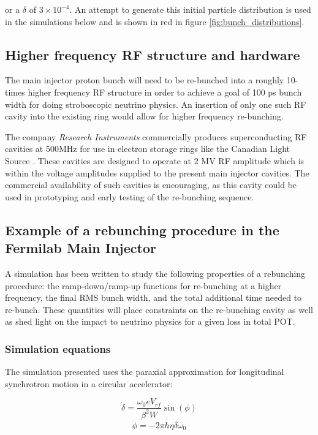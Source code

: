 or a $\delta$ of $3\times 10^{-4}$. An attempt to generate this initial particle distribution
is used in the simulations below and is shown in red in figure \ref{fig:bunch_distributions}.


\subsection{Higher frequency RF structure and hardware}

The main injector proton bunch will need to be re-bunched into a
roughly 10-times higher frequency RF structure in order to achieve a
goal of 100 ps bunch width for doing stroboscopic neutrino physics. An
insertion of only one such RF cavity into the existing ring would
allow for higher frequency re-bunching.

The company \textit{Research Instruments} commercially produces
superconducting RF cavities at 500MHz for use in electron storage
rings like the Canadian Light Source
\cite{nsls-cavity}\cite{cls_stampe}\cite{research_instruments}. These
cavities are designed to operate at 2 MV RF amplitude which is within the
voltage amplitudes supplied to the present main injector cavities.
 The commercial availability of such cavities is encouraging,
as this cavity could be used in prototyping and early testing of the
re-bunching sequence. 


\subsection{Example of a rebunching procedure in the Fermilab Main Injector}

A simulation has been written to study the following properties of a
rebunching procedure: the ramp-down/ramp-up functions for re-bunching
at a higher frequency, the final RMS bunch width, and the total
additional time needed to re-bunch. These quantities will place
constraints on the re-bunching cavity as well as shed light on the
impact to neutrino physics for a given loss in total POT.

\subsubsection{Simulation equations}

The simulation presented uses the paraxial approximation for
longitudinal synchrotron motion in a circular accelerator:

\begin{equation}
\dot{\delta} = \frac{\omega_0 e V_{rf}}{\beta ^2 W}\sin(\phi) 
\end{equation}
\begin{equation}
\dot{\phi} = -2\pi h \eta \delta \omega_0
\end{equation}

